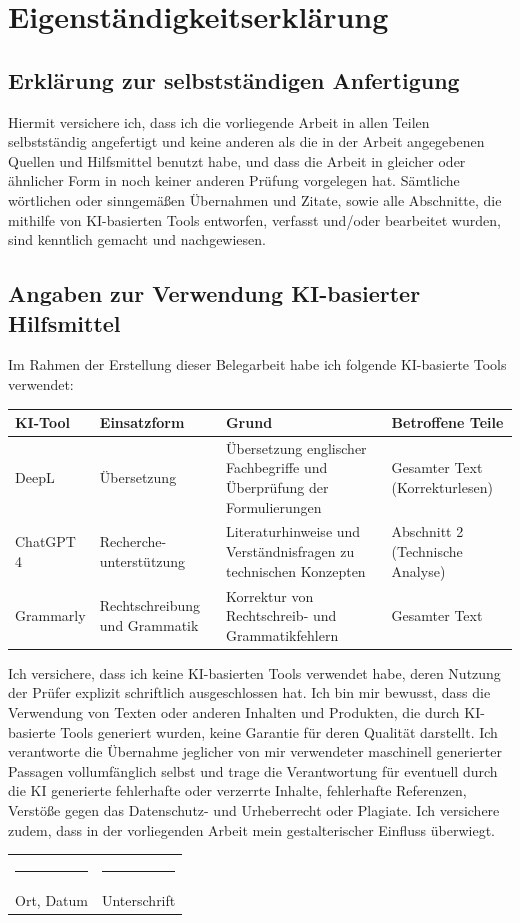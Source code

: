 \documentclass[12pt,a4paper]{article}
\begin{document}
\newpage

\section*{Eigenständigkeitserklärung}

\subsection*{Erklärung zur selbstständigen Anfertigung}

Hiermit versichere ich, dass ich die vorliegende Arbeit in allen Teilen selbstständig angefertigt und keine anderen als die in der Arbeit angegebenen Quellen und Hilfsmittel benutzt habe, und dass die Arbeit in gleicher oder ähnlicher Form in noch keiner anderen Prüfung vorgelegen hat. Sämtliche wörtlichen oder sinngemäßen Übernahmen und Zitate, sowie alle Abschnitte, die mithilfe von KI-basierten Tools entworfen, verfasst und/oder bearbeitet wurden, sind kenntlich gemacht und nachgewiesen.

\subsection*{Angaben zur Verwendung KI-basierter Hilfsmittel}

Im Rahmen der Erstellung dieser Belegarbeit habe ich folgende KI-basierte Tools verwendet:

\begin{table}[h]
\centering
\begin{tabular}{|p{3cm}|p{3cm}|p{3cm}|p{4cm}|}
\hline
\textbf{KI-Tool} & \textbf{Einsatzform} & \textbf{Grund} & \textbf{Betroffene Teile} \\
\hline
DeepL & Übersetzung & Übersetzung englischer Fachbegriffe und Überprüfung der Formulierungen & Gesamter Text (Korrekturlesen) \\
\hline
ChatGPT 4 & Recherche-unterstützung & Literaturhinweise und Verständnisfragen zu technischen Konzepten & Abschnitt 2 (Technische Analyse) \\
\hline
Grammarly & Rechtschreibung und Grammatik & Korrektur von Rechtschreib- und Grammatikfehlern & Gesamter Text \\
\hline
\end{tabular}
\end{table}

Ich versichere, dass ich keine KI-basierten Tools verwendet habe, deren Nutzung der Prüfer explizit schriftlich ausgeschlossen hat. Ich bin mir bewusst, dass die Verwendung von Texten oder anderen Inhalten und Produkten, die durch KI-basierte Tools generiert wurden, keine Garantie für deren Qualität darstellt. Ich verantworte die Übernahme jeglicher von mir verwendeter maschinell generierter Passagen vollumfänglich selbst und trage die Verantwortung für eventuell durch die KI generierte fehlerhafte oder verzerrte Inhalte, fehlerhafte Referenzen, Verstöße gegen das Datenschutz- und Urheberrecht oder Plagiate. Ich versichere zudem, dass in der vorliegenden Arbeit mein gestalterischer Einfluss überwiegt.

\vspace{2cm}

\noindent
\begin{tabular}{@{}p{5cm}p{5cm}@{}}
\rule{5cm}{0.4pt} & \rule{5cm}{0.4pt} \\
Ort, Datum & Unterschrift \\
\end{tabular}
\end{document}
